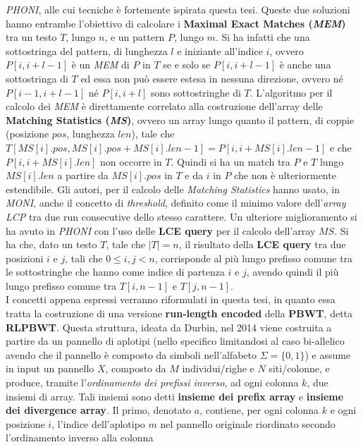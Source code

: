 \documentclass[a4paper,11pt, oneside,italian]{article}
\begin{document}
\textit{PHONI}, alle cui tecniche è fortemente ispirata questa tesi. Queste due
soluzioni hanno entrambe l'obiettivo di 
calcolare i \textbf{Maximal Exact Matches (\textit{MEM})} tra un testo $T$,
lungo $n$, e un pattern $P$, lungo $m$. Si ha infatti che una sottostringa del
pattern, di lunghezza $l$ e iniziante all'indice $i$, ovvero $P[i,i+l-1]$ è un
\textit{MEM} di $P$ in $T$ 
se e solo se $P[i,i+l-1]$ è anche una sottostringa di $T$ ed essa non può essere
estesa 
in nessuna direzione, ovvero né $P[i-1,i+l-1]$ né $P[i,i+l]$ sono
sottostringhe di $T$. L'algoritmo per il calcolo dei \textit{MEM} è direttamente
correlato alla costruzione dell'array delle \textbf{Matching Statistics
  (\textit{MS})}, 
ovvero un array lungo quanto il pattern, di coppie (posizione $pos$, lunghezza
$len$), tale 
che 
$T[MS[i].pos,MS[i].pos+MS[i].len-1]=P[i,i+MS[i].len-1]$ e che $P[i,i+MS[i].len]$ 
non occorre in $T$. Quindi si ha un match tra $P$ e $T$ lungo $MS[i].len$ a
partire da $MS[i].pos$ in $T$ e da $i$ in $P$ che non è ulteriormente
estendibile. Gli autori, per il calcolo delle \textit{Matching Statistics} hanno
usato, in \textit{MONI}, anche il concetto di \textit{threshold}, definito come
il minimo valore dell'\textit{array LCP} tra due run consecutive dello stesso
carattere. Un 
ulteriore miglioramento si ha avuto in \textit{PHONI} con l'uso delle
\textbf{LCE query} per il calcolo dell'array $MS$. Si ha che, dato un testo $T$,
tale che $|T|=n$, il risultato della \textbf{LCE query} tra 
due posizioni $i$ e $j$, tali che $0\leq i,j<n$, corrisponde al più lungo
prefisso comune tra le sottostringhe che hanno come indice di partenza $i$ e
$j$, avendo quindi il più lungo prefisso comune tra $T[i,n-1]$ e
$T[j,n-1]$.\\
I concetti appena espressi verranno riformulati in questa tesi, in quanto essa
tratta la costruzione di una versione \textbf{run-length encoded} della
\textbf{PBWT}, detta \textbf{RLPBWT}. Questa struttura, ideata da Durbin, nel
2014 viene costruita a partire da un 
pannello di aplotipi (nello specifico limitandosi al caso bi-allelico avendo che
il pannello è composto da simboli nell'alfabeto $\Sigma=\{0,1\}$) e 
assume in input un pannello $X$, composto da $M$ individui/righe e $N$
siti/colonne, e produce, tramite l'\textit{ordinamento dei prefissi inverso}, ad
ogni colonna $k$, due insiemi di array. Tali insiemi sono detti \textbf{insieme
  dei prefix array} e \textbf{insieme dei divergence array}. Il primo, denotato
$a$, contiene, per ogni colonna $k$ e ogni posizione $i$, l'indice dell'aplotipo
$m$ nel pannello originale riordinato secondo l'ordinamento inverso alla colonna
\end{document}
